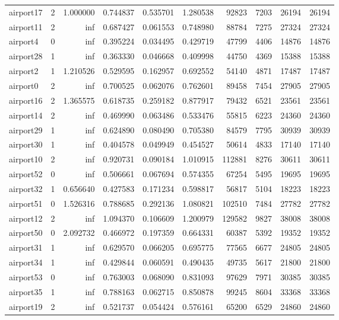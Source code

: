 \documentclass[../../../thesis.tex]{subfiles}
\begin{document}
\begin{longtable}{|l|r|r|r|r|r|r|r|r|r|}
airport17 & 2 & 1.000000 & 0.744837 & 0.535701 & 1.280538 & 92823 & 7203 & 26194 & 26194 \\
airport11 & 2 & inf & 0.687427 & 0.061553 & 0.748980 & 88784 & 7275 & 27324 & 27324 \\
airport4 & 0 & inf & 0.395224 & 0.034495 & 0.429719 & 47799 & 4406 & 14876 & 14876 \\
airport28 & 1 & inf & 0.363330 & 0.046668 & 0.409998 & 44750 & 4369 & 15388 & 15388 \\
airport2 & 1 & 1.210526 & 0.529595 & 0.162957 & 0.692552 & 54140 & 4871 & 17487 & 17487 \\
airport0 & 2 & inf & 0.700525 & 0.062076 & 0.762601 & 89458 & 7454 & 27905 & 27905 \\
airport16 & 2 & 1.365575 & 0.618735 & 0.259182 & 0.877917 & 79432 & 6521 & 23561 & 23561 \\
airport14 & 2 & inf & 0.469990 & 0.063486 & 0.533476 & 55815 & 6223 & 24360 & 24360 \\
airport29 & 1 & inf & 0.624890 & 0.080490 & 0.705380 & 84579 & 7795 & 30939 & 30939 \\
airport30 & 1 & inf & 0.404578 & 0.049949 & 0.454527 & 50614 & 4833 & 17140 & 17140 \\
airport10 & 2 & inf & 0.920731 & 0.090184 & 1.010915 & 112881 & 8276 & 30611 & 30611 \\
airport52 & 0 & inf & 0.506661 & 0.067694 & 0.574355 & 67254 & 5495 & 19695 & 19695 \\
airport32 & 1 & 0.656640 & 0.427583 & 0.171234 & 0.598817 & 56817 & 5104 & 18223 & 18223 \\
airport51 & 0 & 1.526316 & 0.788685 & 0.292136 & 1.080821 & 102510 & 7484 & 27782 & 27782 \\
airport12 & 2 & inf & 1.094370 & 0.106609 & 1.200979 & 129582 & 9827 & 38008 & 38008 \\
airport50 & 0 & 2.092732 & 0.466972 & 0.197359 & 0.664331 & 60387 & 5392 & 19352 & 19352 \\
airport31 & 1 & inf & 0.629570 & 0.066205 & 0.695775 & 77565 & 6677 & 24805 & 24805 \\
airport34 & 1 & inf & 0.429844 & 0.060591 & 0.490435 & 49735 & 5617 & 21800 & 21800 \\
airport53 & 0 & inf & 0.763003 & 0.068090 & 0.831093 & 97629 & 7971 & 30385 & 30385 \\
airport35 & 1 & inf & 0.788163 & 0.062715 & 0.850878 & 99245 & 8604 & 33368 & 33368 \\
airport19 & 2 & inf & 0.521737 & 0.054424 & 0.576161 & 65200 & 6529 & 24860 & 24860 \\

\end{longtable}
\end{document}
